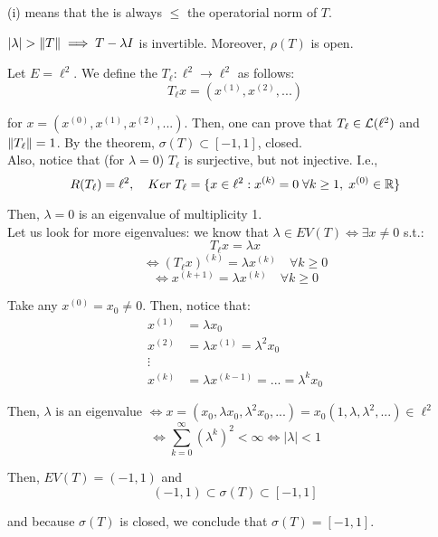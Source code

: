 \begin{fremark}
    (i) means that the  is always $\leq$ the operatorial norm of $T$.
\end{fremark}

\begin{fremark}
    $|\lambda| > \left\|T\right\| \implies T - \lambda I$ is invertible. Moreover, $\rho(T)$ is open.
\end{fremark}

\vspace{1em}

\begin{fexample}
    Let $E = \ell^2$. We define the  $T_{\ell}: \ell^2 \to \ell^2$ as
    follows:
    $$T_{\ell} x = (x^{(1)}, x^{(2)}, ...)$$
    
    for $x = (x^{(0)}, x^{(1)}, x^{(2)}, ...)$. Then, one can prove that $T_{\ell} \in \mathcal{L}(\ell^2)$
    and $\left\|T_{\ell}\right\| = 1$. By the theorem, $\sigma(T) \subset [-1, 1]$, closed.\\

    Also, notice that (for $\lambda = 0$) $T_{\ell}$ is surjective, but not injective. I.e., 
    $$R(T_{\ell}) = \ell^2, \quad Ker\; T_{\ell} = \{x \in \ell^2: x^{(k)} = 0 \; \forall k \geq 1, \; x^{(0)} \in \mathbb{R}\}$$

    Then, $\lambda = 0$ is an eigenvalue of multiplicity 1.\\

    Let us look for more eigenvalues: we know that $\lambda \in EV(T) \iff \exists x \neq 0$ s.t.:
    $$T_{\ell} x = \lambda x$$
    $$\iff (T_{\ell}x)^{(k)} = \lambda x^{(k)} \quad \forall k \geq 0$$
    $$\iff x^{(k + 1)} = \lambda x^{(k)} \quad \forall k \geq 0$$

    Take any $x^{(0)} = x_0 \neq 0$. Then, notice that:
    \begin{align*}
        x^{(1)} &= \lambda x_0\\
        x^{(2)} &= \lambda x^{(1)} = \lambda^2 x_0\\
        \vdots\\
        x^{(k)} &= \lambda x^{(k - 1)} = ... = \lambda^k x_0
    \end{align*}

    Then, $\lambda$ is an eigenvalue $\iff x = (x_0, \lambda x_0, \lambda^2 x_0, ...) = x_0 (1, \lambda, \lambda^2, ...) \in \ell^2$
    $$\iff \sum_{k=0}^{\infty} (\lambda^k)^2 < \infty \iff |\lambda| < 1$$

    Then, $EV(T) = (-1, 1)$ and
    $$(-1, 1) \subset \sigma(T) \subset [-1, 1]$$

    and because $\sigma(T)$ is closed, we conclude that $\sigma(T) = [-1, 1]$.
\end{fexample}

